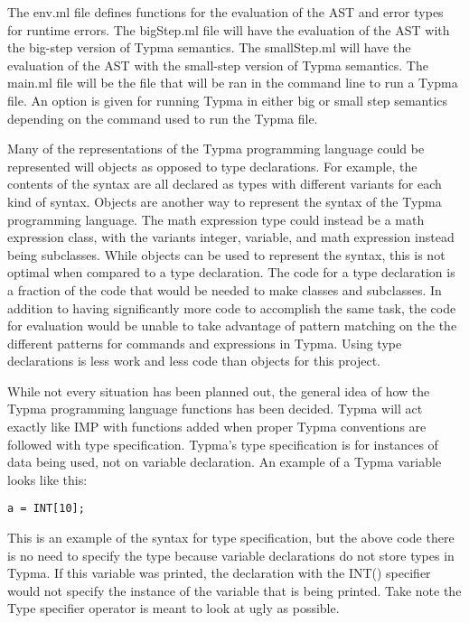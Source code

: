 \documentclass[10pt,twocolumn]{article}
\begin{document}
The env.ml file defines functions for the evaluation of the AST and error types for runtime errors. The bigStep.ml file will have the evaluation of the AST with the big-step version of Typma semantics. The smallStep.ml will have the evaluation of the AST with the small-step version of Typma semantics. The main.ml file will be the file that will be ran in the command line to run a Typma file. An option is given for running Typma in either big or small step semantics depending on the command used to run the Typma file.

Many of the representations of the Typma programming language could be represented will objects as opposed to type declarations. For example, the contents of the syntax are all declared as types with different variants for each kind of syntax. Objects are another way to represent the syntax of the Typma programming language. The math expression type could instead be a math expression class, with the variants integer, variable, and math expression instead being subclasses. While objects can be used to represent the syntax, this is not optimal when compared to a type declaration. The code for a type declaration is a fraction of the code that would be needed to make classes and subclasses. In addition to having significantly more code to accomplish the same task, the code for evaluation would be unable to take advantage of pattern matching on the the different patterns for commands and expressions in Typma. Using type declarations is less work and less code than objects for this project.

While not every situation has been planned out, the general idea of how the Typma programming language functions has been decided. Typma will act exactly like IMP with functions added when proper Typma conventions are followed with type specification. Typma's type specification is for instances of data being used, not on variable declaration. An example of a Typma variable looks like this:

\begin{lstlisting}
a = INT[10];
\end{lstlisting}

This is an example of the syntax for type specification, but the above code there is no need to specify the type because variable declarations do not store types in Typma. If this variable was printed, the declaration with the INT() specifier would not specify the instance of the variable that is being printed. Take note the Type specifier operator is meant to look at ugly as possible.
\end{document}
